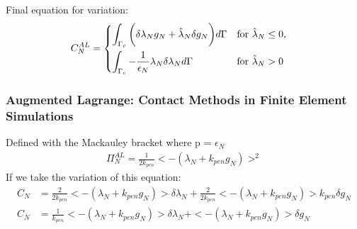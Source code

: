 \documentclass[12pt,3p]{article}
\begin{document}
Final equation for variation: 
\begin{align}\label{659}
C_{N}^{AL} &= 
\begin{dcases}
    \int_{\Gamma_c} \bigg( \delta \lambda_N g_N + \hat{\lambda}_N \delta g_N \bigg) d \Gamma & \text{for } \hat{\lambda}_N \leq 0, \\
    \int_{\Gamma_c} -\frac{1}{\epsilon_N} \lambda_N \delta \lambda_N d \Gamma               & \text{for } \hat{\lambda}_N > 0
\end{dcases}
\end{align}

\subsubsection{Augmented Lagrange: Contact Methods in Finite Element Simulations}
Defined with the Mackauley bracket where p = $\epsilon_N$
\begin{align*}
\Pi_{N}^{AL} = \frac{1}{2 k_{pen}} < - (\lambda_N + k_{pen} g_N) >^2
\end{align*}
If we take the variation of this equation:
\begin{align*}
C_N &= \frac{2}{2 k_{pen}} <- (\lambda_N + k_{pen} g_N)> \delta \lambda_N + \frac{2}{2 k_{pen}} <-(\lambda_N + k_{pen} g_N) > k_{pen} \delta g_N \\
C_N &= \frac{1}{k_{pen}} <- (\lambda_N + k_{pen} g_N)> \delta \lambda_N + <-(\lambda_N + k_{pen} g_N) > \delta g_N
\end{align*}
\end{document}
